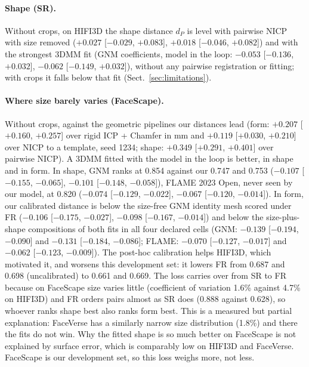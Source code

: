 \documentclass[10pt,twocolumn,letterpaper]{article}
\begin{document}
\paragraph{Shape (SR).} Without crops, on HIFI3D the shape distance $d_P$ is level with pairwise NICP with size removed ($+0.027$ [$-0.029$, $+0.083$], $+0.018$ [$-0.046$, $+0.082$]) and with the strongest 3DMM fit (GNM coefficients, model in the loop: $-0.053$ [$-0.136$, $+0.032$], $-0.062$ [$-0.149$, $+0.032$]), without any pairwise registration or fitting; with crops it falls below that fit (Sect.~\ref{sec:limitations}).

\paragraph{Where size barely varies (FaceScape).} Without crops, against the geometric pipelines our distances lead (form: $+0.207$ [$+0.160$, $+0.257$] over rigid ICP + Chamfer in mm and $+0.119$ [$+0.030$, $+0.210$] over NICP to a template, seed 1234; shape: $+0.349$ [$+0.291$, $+0.401$] over pairwise NICP). A 3DMM fitted with the model in the loop is better, in shape and in form. In shape, GNM ranks at 0.854 against our 0.747 and 0.753 ($-0.107$ [$-0.155$, $-0.065$], $-0.101$ [$-0.148$, $-0.058$]), FLAME 2023 Open, never seen by our model, at 0.820 ($-0.074$ [$-0.129$, $-0.022$], $-0.067$ [$-0.120$, $-0.014$]). In form, our calibrated distance is below the size-free GNM identity mesh scored under FR ($-0.106$ [$-0.175$, $-0.027$], $-0.098$ [$-0.167$, $-0.014$]) and below the size-plus-shape compositions of both fits in all four declared cells (GNM: $-0.139$ [$-0.194$, $-0.090$] and $-0.131$ [$-0.184$, $-0.086$]; FLAME: $-0.070$ [$-0.127$, $-0.017$] and $-0.062$ [$-0.123$, $-0.009$]). The post-hoc calibration helps HIFI3D, which motivated it, and worsens this development set: it lowers FR from 0.687 and 0.698 (uncalibrated) to 0.661 and 0.669. The loss carries over from SR to FR because on FaceScape size varies little (coefficient of variation 1.6\% against 4.7\% on HIFI3D) and FR orders pairs almost as SR does (0.888 against 0.628), so whoever ranks shape best also ranks form best. This is a measured but partial explanation: FaceVerse has a similarly narrow size distribution (1.8\%) and there the fits do not win. Why the fitted shape is so much better on FaceScape is not explained by surface error, which is comparably low on HIFI3D and FaceVerse. FaceScape is our development set, so this loss weighs more, not less.
\end{document}
